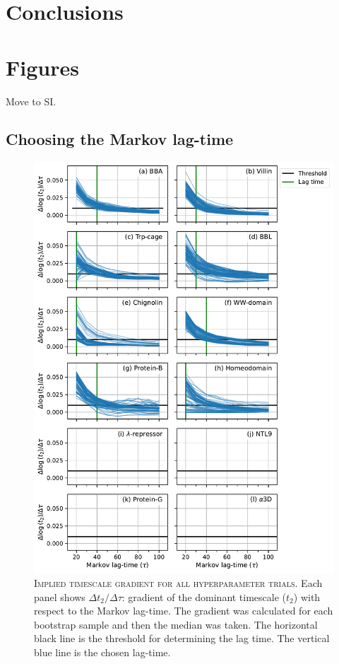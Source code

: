 \documentclass{article}
\begin{document}
\section{Conclusions}

\clearpage
\section{Figures}

Move to SI. 

\clearpage
\subsection{Choosing the Markov lag-time}

\begin{figure}[h]
    \centering
    \includegraphics[height=0.65\textheight]{figures/t_2_gradient_sharey_True_log_True_denom_delta_x.pdf}
    \caption{\textsc{Implied timescale gradient for all hyperparameter trials.} Each panel shows $\Delta t_{2}/\Delta \tau$: gradient of the dominant timescale ($t_{2}$) with respect to the Markov lag-time. The gradient was calculated for each bootstrap sample and then the median was taken. The horizontal black line is the threshold for determining the lag time. The vertical blue line is the chosen lag-time.}
    \label{fig:t2_gradient}
\end{figure}
\end{document}
